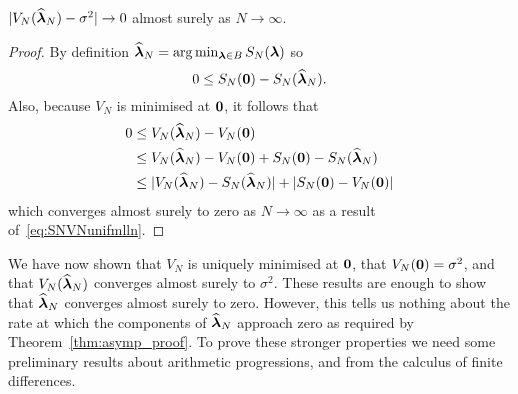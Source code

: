 \documentclass[journal]{IEEEtran}
\begin{document}
\begin{lemma} \label{lem:ESNconv}
$\vert V_N(\widehat{\boldsymbol{\lambda}}_N) - \sigma^2 \vert \rightarrow 0$ almost surely as $N \rightarrow \infty$.
\end{lemma}
\begin{proof}
By definition $\widehat{\boldsymbol{\lambda}}_N =\arg\min_{\boldsymbol{\lambda}\in B} S_N(\boldsymbol{\lambda})$ so 
\[
0 \leq S_{N}(\boldsymbol{0}) - S_N(\widehat{\boldsymbol{\lambda}}_N).
\]  
Also, because $V_N$ is minimised at $\boldsymbol{0}$, it follows that 
\begin{align*}
0 &\leq V_N(\widehat{\boldsymbol{\lambda}}_N) - V_N(\boldsymbol{0}) \\
 &\leq V_N(\widehat{\boldsymbol{\lambda}}_N) - V_N(\boldsymbol{0}) + S_{N}(\boldsymbol{0}) - S_N(\widehat{\boldsymbol{\lambda}}_N)   \\
&\leq \vert  V_N(\widehat{\boldsymbol{\lambda}}_N) - S_N(\widehat{\boldsymbol{\lambda}}_N)  \vert + \vert  S_{N}(\boldsymbol{0}) - V_N(\boldsymbol{0})  \vert
\end{align*}
which converges almost surely to zero as $N\rightarrow\infty$ as a result of~\eqref{eq:SNVNunifmlln}.
\end{proof}


We have now shown that $V_N$ is uniquely minimised at $\boldsymbol{0}$, that $V_N(\boldsymbol{0}) = \sigma^2$, and that $V_N(\widehat{\boldsymbol{\lambda}}_N)$ converges almost surely to $\sigma^2$.  These results are enough to show that $\widehat{\boldsymbol{\lambda}}_N$ converges almost surely to zero.  However, this tells us nothing about the rate at which the components of $\widehat{\boldsymbol{\lambda}}_N$ approach zero as required by Theorem~\ref{thm:asymp_proof}.  To prove these stronger properties we need some preliminary results about arithmetic progressions, and from the calculus of finite differences.
 
\end{document}
